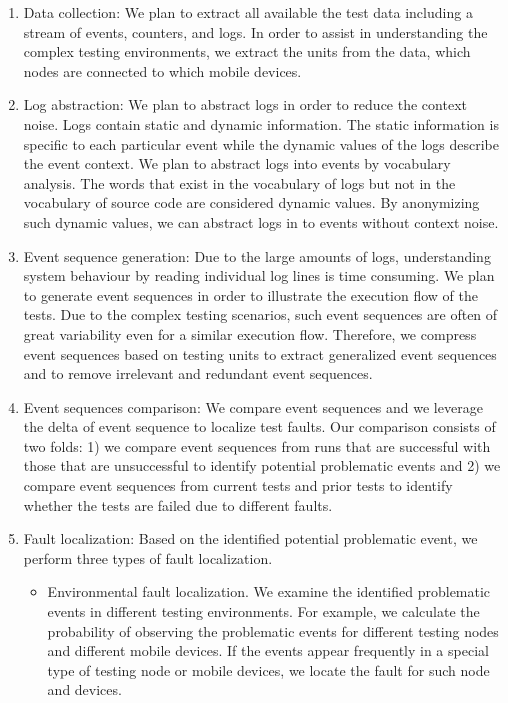 \begin{enumerate}

\item Data collection: We plan to extract all available the test data including a stream of events, counters, and logs. In order to assist in understanding the complex testing environments, we extract the units from the data, \ie which nodes are connected to which mobile devices.

\item Log abstraction: We plan to abstract logs in order to reduce the context noise. Logs contain static and dynamic information. The static information is specific to each particular event while the dynamic values of the logs describe the event context. We plan to abstract logs into events by vocabulary analysis. The words that exist in the vocabulary of logs but not in the vocabulary of source code are considered dynamic values. By anonymizing such dynamic values, we can abstract logs in to events without context noise. 

\item Event sequence generation: Due to the large amounts of logs, understanding system behaviour by reading individual log lines is time consuming. We plan to generate event sequences in order to illustrate the execution flow of the tests. Due to the complex testing scenarios, such event sequences are often of great variability even for a similar execution flow. Therefore, we compress event sequences based on testing units to extract generalized event sequences and to remove irrelevant and redundant event sequences.

\item Event sequences comparison: We compare event sequences and we leverage the delta of event sequence to localize test faults. Our comparison consists of two folds: 1) we compare event sequences from runs that are successful with those that are unsuccessful to identify potential problematic events and 2) we compare event sequences from current tests and prior tests to identify whether the tests are failed due to different faults.

\item Fault localization: Based on the identified potential problematic event, we perform three types of fault localization. 
	\begin{itemize}
		\item Environmental fault localization. We examine the identified problematic events in different testing environments. For example, we calculate the probability of observing the problematic events for different testing nodes and different mobile devices. If the events appear frequently in a special type of testing node or mobile devices, we locate the fault for such node and devices. 
		

\end{itemize}
\end{enumerate}
